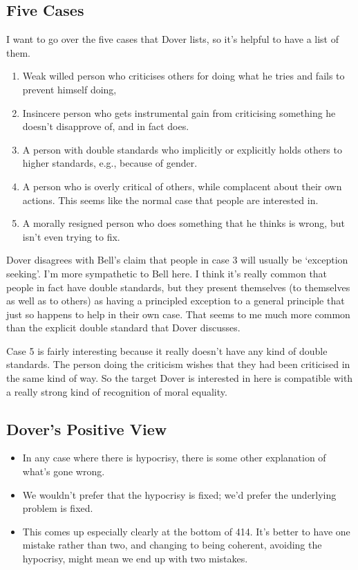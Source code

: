 \documentclass[
]{article}
\providecommand{\tightlist}{%
  \setlength{\itemsep}{0pt}\setlength{\parskip}{0pt}}
\begin{document}
\hypertarget{five-cases}{%
\subsection{Five Cases}\label{five-cases}}

I want to go over the five cases that Dover lists, so it's helpful to
have a list of them.

\begin{enumerate}
\def\labelenumi{\arabic{enumi}.}
\tightlist
\item
  Weak willed person who criticises others for doing what he tries and
  fails to prevent himself doing,
\item
  Insincere person who gets instrumental gain from criticising something
  he doesn't disapprove of, and in fact does.
\item
  A person with double standards who implicitly or explicitly holds
  others to higher standards, e.g., because of gender.
\item
  A person who is overly critical of others, while complacent about
  their own actions. This seems like the normal case that people are
  interested in.
\item
  A morally resigned person who does something that he thinks is wrong,
  but isn't even trying to fix.
\end{enumerate}

Dover disagrees with Bell's claim that people in case 3 will usually be
`exception seeking'. I'm more sympathetic to Bell here. I think it's
really common that people in fact have double standards, but they
present themselves (to themselves as well as to others) as having a
principled exception to a general principle that just so happens to help
in their own case. That seems to me much more common than the explicit
double standard that Dover discusses.

Case 5 is fairly interesting because it really doesn't have any kind of
double standards. The person doing the criticism wishes that they had
been criticised in the same kind of way. So the target Dover is
interested in here is compatible with a really strong kind of
recognition of moral equality.

\hypertarget{dovers-positive-view}{%
\subsection{Dover's Positive View}\label{dovers-positive-view}}

\begin{itemize}
\tightlist
\item
  In any case where there is hypocrisy, there is some other explanation
  of what's gone wrong.
\item
  We wouldn't prefer that the hypocrisy is fixed; we'd prefer the
  underlying problem is fixed.
\item
  This comes up especially clearly at the bottom of 414. It's better to
  have one mistake rather than two, and changing to being coherent,
  avoiding the hypocrisy, might mean we end up with two mistakes.
\end{itemize}
\end{document}
